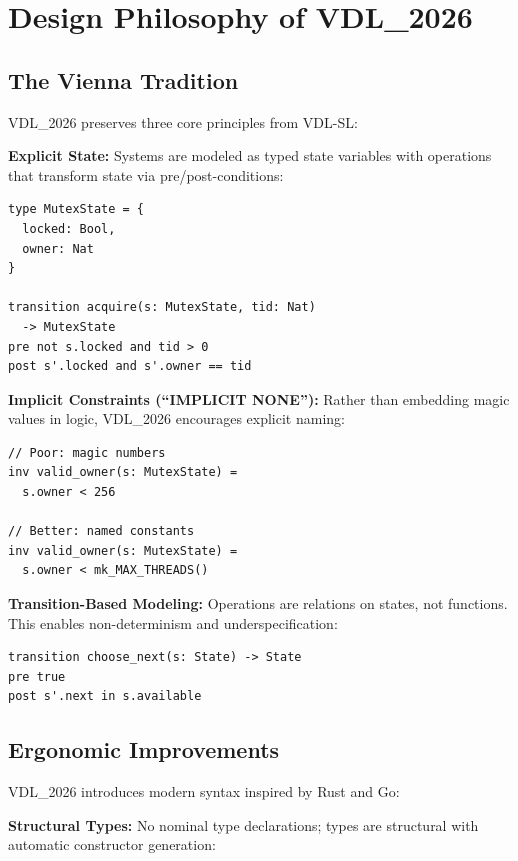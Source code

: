 \documentclass[conference]{IEEEtran}
\begin{document}
\section{Design Philosophy of VDL\_2026}
\label{sec:design}

\subsection{The Vienna Tradition}

VDL\_2026 preserves three core principles from VDL-SL:

\textbf{Explicit State:} Systems are modeled as typed state variables with operations that transform state via pre/post-conditions:

\begin{lstlisting}[caption={Explicit state modeling}]
type MutexState = {
  locked: Bool,
  owner: Nat
}

transition acquire(s: MutexState, tid: Nat)
  -> MutexState
pre not s.locked and tid > 0
post s'.locked and s'.owner == tid
\end{lstlisting}

\textbf{Implicit Constraints (``IMPLICIT NONE''):} Rather than embedding magic values in logic, VDL\_2026 encourages explicit naming:

\begin{lstlisting}[caption={Explicit naming convention}]
// Poor: magic numbers
inv valid_owner(s: MutexState) =
  s.owner < 256

// Better: named constants
inv valid_owner(s: MutexState) =
  s.owner < mk_MAX_THREADS()
\end{lstlisting}

\textbf{Transition-Based Modeling:} Operations are relations on states, not functions. This enables non-determinism and underspecification:

\begin{lstlisting}[caption={Non-deterministic transitions}]
transition choose_next(s: State) -> State
pre true
post s'.next in s.available
\end{lstlisting}

\subsection{Ergonomic Improvements}

VDL\_2026 introduces modern syntax inspired by Rust and Go:

\textbf{Structural Types:} No nominal type declarations; types are structural with automatic constructor generation:
\end{document}
